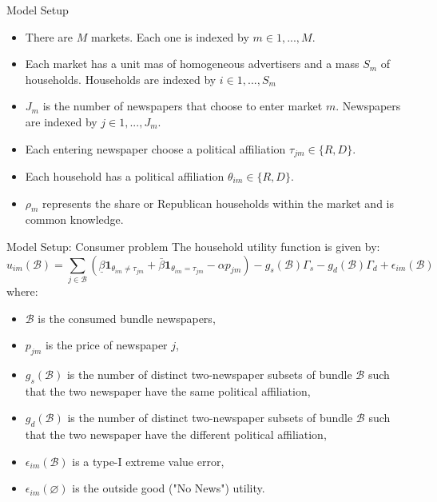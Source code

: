\documentclass{beamer}
\begin{document}
\begin{frame}[t]{Model Setup}
  \begin{itemize}
    \item There are $M$ markets. Each one is indexed by $m \in {1,...,M}$.
    \item Each market has a unit mas of homogeneous advertisers and a mass
      $S_m$ of households. Households are indexed by $i \in {1,...,S_m}$
    \item $J_m$ is the number of newspapers that choose to enter market $m$.
      Newspapers are indexed by $j \in {1,...,J_m}$.
    \item Each entering newspaper choose a political affiliation
      $\tau_{jm} \in \{R,D\}.$
    \item Each household has a political affiliation $\theta_{im} \in \{R, D\}$.
    \item $\rho_m$ represents the share or Republican households within the
      market and is common knowledge.
  \end{itemize}
\end{frame}

\begin{frame}[t]{Model Setup: Consumer problem}
  The household utility function is given by:
  \[ u_{im}(\mathcal{B}) = \sum_{j \in \mathcal{B}}
    (\underline{\beta}\textbf{1}_{\theta_{im} \ne \tau_{jm}}
    + \bar{\beta}\textbf{1}_{\theta_{im} = \tau_{jm}}
    - \alpha p_{jm}) -
    g_s(\mathcal{B})\Gamma_s - g_d(\mathcal{B})\Gamma_d +
    \epsilon_{im}(\mathcal{B}) \]
  where:
  \begin{itemize}
    \item $\mathcal{B}$ is the consumed bundle newspapers,
    \item $p_{jm}$ is the price of newspaper $j$,
    \item $g_s(\mathcal{B})$ is the number of distinct two-newspaper subsets
      of bundle $\mathcal{B}$ such that the two newspaper have the same
      political affiliation,
    \item $g_d(\mathcal{B})$ is the number of distinct two-newspaper subsets
      of bundle $\mathcal{B}$ such that the two newspaper have the different
      political affiliation,
    \item $\epsilon_{im}(\mathcal{B})$ is a type-I extreme value error,
    \item $\epsilon_{im}(\varnothing)$ is the outside good ("No News") utility.
   \end{itemize}
\end{frame}
\end{document}
